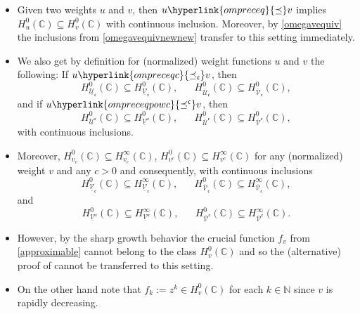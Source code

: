 \documentclass[10pt]{amsart}%
\numberwithin{equation}{section}
\theoremstyle{plain}
\newcommand{\CC}{\mathbb{C}}
\newcommand{\NN}{\mathbb{N}}
\begin{document}
\begin{itemize}
	\item[$(a)$] Given two weights $u$ and $v$, then $u\hyperlink{ompreceq}{\preceq}v$ implies $H^{0}_{u}(\CC)\subseteq H^{0}_{v}(\CC)$ with continuous inclusion. Moreover, by \eqref{omegavequiv} the inclusions from \eqref{omegavequivnewnew} transfer to this setting immediately.
	
	\item[$(b)$] We also get by definition for (normalized) weight functions $u$ and $v$ the following: If $u\hyperlink{ompreceqc}{\preceq_{\mathfrak{c}}}v$, then
	$$H^{0}_{\underline{\mathcal{U}}_{\mathfrak{c}}}(\CC)\subseteq H^{0}_{\underline{\mathcal{V}}_{\mathfrak{c}}}(\CC),\hspace{20pt}H^{0}_{\overline{\mathcal{U}}_{\mathfrak{c}}}(\CC)\subseteq H^{0}_{\overline{\mathcal{V}}_{\mathfrak{c}}}(\CC),$$
	and if $u\hyperlink{ompreceqpowc}{\preceq^{\mathfrak{c}}}v$, then
	$$H^{0}_{\underline{\mathcal{U}}^{\mathfrak{c}}}(\CC)\subseteq H^{0}_{\underline{\mathcal{V}}^{\mathfrak{c}}}(\CC),\hspace{20pt}H^{0}_{\overline{\mathcal{U}}^{\mathfrak{c}}}(\CC)\subseteq H^{0}_{\overline{\mathcal{V}}^{\mathfrak{c}}}(\CC),$$
	with continuous inclusions.
	
	\item[$(c)$] Moreover, $H^{0}_{v_c}(\CC)\subseteq H^{\infty}_{v_c}(\CC)$, $H^{0}_{v^c}(\CC)\subseteq H^{\infty}_{v^c}(\CC)$ for any (normalized) weight $v$ and any $c>0$ and consequently, with continuous inclusions
	$$H^{0}_{\underline{\mathcal{V}}_{\mathfrak{c}}}(\CC)\subseteq H^{\infty}_{\underline{\mathcal{V}}_{\mathfrak{c}}}(\CC),\hspace{20pt}H^{0}_{\overline{\mathcal{V}}_{\mathfrak{c}}}(\CC)\subseteq H^{\infty}_{\overline{\mathcal{V}}_{\mathfrak{c}}}(\CC),$$
	and
	$$H^{0}_{\underline{\mathcal{V}}^{\mathfrak{c}}}(\CC)\subseteq H^{\infty}_{\underline{\mathcal{V}}^{\mathfrak{c}}}(\CC),\hspace{20pt}H^{0}_{\overline{\mathcal{V}}^{\mathfrak{c}}}(\CC)\subseteq H^{\infty}_{\overline{\mathcal{V}}^{\mathfrak{c}}}(\CC).$$
	
	\item[$(d)$] However, by the sharp growth behavior the crucial function $f_v$ from \eqref{approximable} cannot belong to the class $H^{0}_{v}(\CC)$ and so the (alternative) proof of \cite[Thm. 3.3]{weightedentirecharacterization} cannot be transferred to this setting.
	
	\item[$(e)$] On the other hand note that $f_k:=z^k\in H^{0}_v(\CC)$ for each $k\in\NN$ since $v$ is rapidly decreasing.
\end{itemize}
\end{document}
